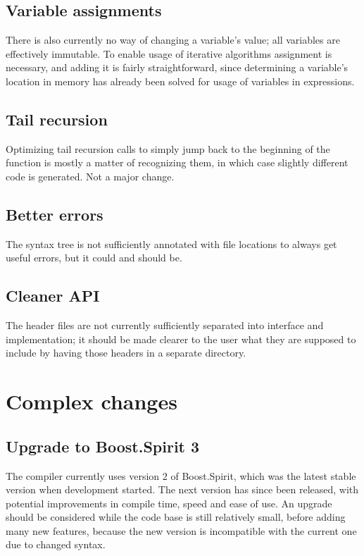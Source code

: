 		\subsection{Variable assignments}
		
		There is also currently no way of changing a variable's value; all variables are effectively immutable. To enable usage of iterative algorithms assignment is necessary, and adding it is fairly straightforward, since determining a variable's location in memory has already been solved for usage of variables in expressions.
		
		\subsection{Tail recursion}
		
		Optimizing tail recursion calls to simply jump back to the beginning of the function is mostly a matter of recognizing them, in which case slightly different code is generated. Not a major change.
		
		\subsection{Better errors}
		
		The syntax tree is not sufficiently annotated with file locations to always get useful errors, but it could and should be.
		
		\subsection{Cleaner API}
		
		The header files are not currently sufficiently separated into interface and implementation; it should be made clearer to the user what they are supposed to include by having those headers in a separate directory.
	
	\section{Complex changes}
		
		\subsection{Upgrade to Boost.Spirit 3}
		
		The compiler currently uses version 2 of Boost.Spirit, which was the latest stable version when development started. The next version has since been released, with potential improvements in compile time, speed and ease of use. An upgrade should be considered while the code base is still relatively small, before adding many new features, because the new version is incompatible with the current one due to changed syntax.
		
